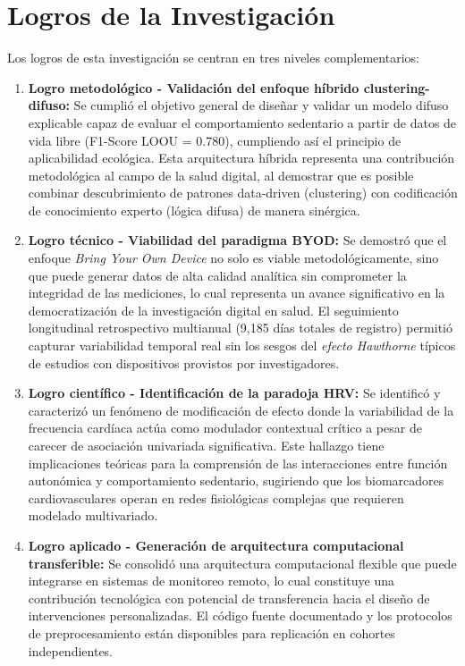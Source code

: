 \section{Logros de la Investigación}
\label{sec:logros}

Los logros de esta investigación se centran en tres niveles complementarios:

\begin{enumerate}
    \item \textbf{Logro metodológico - Validación del enfoque híbrido clustering-difuso:} Se cumplió el objetivo general de diseñar y validar un modelo difuso explicable capaz de evaluar el comportamiento sedentario a partir de datos de vida libre (F1-Score LOOU = 0.780), cumpliendo así el principio de aplicabilidad ecológica. Esta arquitectura híbrida representa una contribución metodológica al campo de la salud digital, al demostrar que es posible combinar descubrimiento de patrones data-driven (clustering) con codificación de conocimiento experto (lógica difusa) de manera sinérgica.
    
    \item \textbf{Logro técnico - Viabilidad del paradigma BYOD:} Se demostró que el enfoque \textit{Bring Your Own Device} no solo es viable metodológicamente, sino que puede generar datos de alta calidad analítica sin comprometer la integridad de las mediciones, lo cual representa un avance significativo en la democratización de la investigación digital en salud. El seguimiento longitudinal retrospectivo multianual (9,185 días totales de registro) permitió capturar variabilidad temporal real sin los sesgos del \textit{efecto Hawthorne} típicos de estudios con dispositivos provistos por investigadores.
    
    \item \textbf{Logro científico - Identificación de la paradoja HRV:} Se identificó y caracterizó un fenómeno de modificación de efecto donde la variabilidad de la frecuencia cardíaca actúa como modulador contextual crítico a pesar de carecer de asociación univariada significativa. Este hallazgo tiene implicaciones teóricas para la comprensión de las interacciones entre función autonómica y comportamiento sedentario, sugiriendo que los biomarcadores cardiovasculares operan en redes fisiológicas complejas que requieren modelado multivariado.
    
    \item \textbf{Logro aplicado - Generación de arquitectura computacional transferible:} Se consolidó una arquitectura computacional flexible que puede integrarse en sistemas de monitoreo remoto, lo cual constituye una contribución tecnológica con potencial de transferencia hacia el diseño de intervenciones personalizadas. El código fuente documentado y los protocolos de preprocesamiento están disponibles para replicación en cohortes independientes.
    

\end{enumerate}
